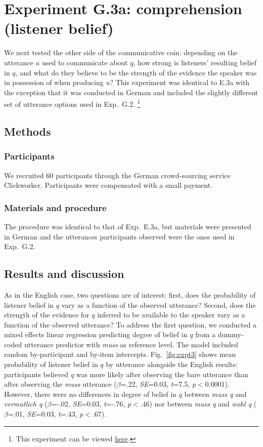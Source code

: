 \documentclass[11pt]{article}
\begin{document}
\section{Experiment G.3a: comprehension (listener belief)}

We next tested the other side of the communicative coin: depending on the utterance $u$ used to communicate about $q$, how strong is listeners' resulting belief in $q$, and what do they believe to be the strength of the evidence the speaker was in possession of when producing $u$? This experiment was identical to E.3a with the exception that it was conducted in German and included the slightly different set of utterance options used in Exp.~G.2.
\footnote{This experiment can be viewed \href{http://web.stanford.edu/~jdegen/cgi-bin/2_dp_comprehension_listenerbelief/modals.html}{here}.}

\subsection{Methods}

\subsubsection{Participants}

We recruited 60  participants through the German crowd-sourcing service Clickworker. Participants were compensated with a small payment.

\subsubsection{Materials and procedure}

The procedure was identical to that of Exp.~E.3a, but materials were presented in German and the utterances participants observed were the ones used in Exp.~G.2.

\subsection{Results and discussion}

As in the English case, two questions are of interest: first, does the probability of listener belief in $q$ vary as a function of the observed utterance? Second, does the strength of the evidence for $q$ inferred to be available to the speaker vary as a function of the observed utterance? To address the first question, we conducted a mixed effects linear regression predicting degree of belief in $q$ from a dummy-coded utterance predictor with \emph{muss} as reference level. The model included random by-participant and by-item intercepts. Fig.~\ref{fig:expt3} shows mean probability of listener belief in $q$ by utterance alongside the English results: participants believed \emph{q} was more likely after observing the bare utterance than after observing the \emph{muss} utterance   ($\beta$=.22, \emph{SE}=0.03, \emph{t}=7.5, \emph{p}$<$0.0001). However, there were no differences in degree of belief in $q$ between \emph{muss q} and \emph{vermutlich q} ($\beta$=-.02, \emph{SE}=0.03, \emph{t}=-.76, \emph{p}$<$.46) nor between \emph{muss q} and \emph{wohl q} ($\beta$=.01, \emph{SE}=0.03, \emph{t}=.43, \emph{p}$<$.67). 
\end{document}
